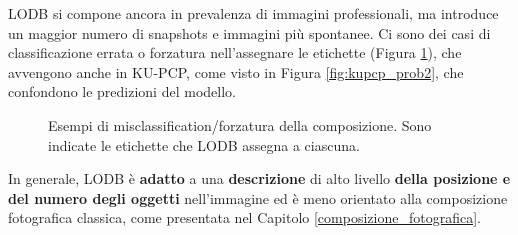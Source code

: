 LODB si compone ancora in prevalenza di immagini professionali, ma introduce un maggior numero di snapshots e immagini più spontanee. Ci sono dei casi di classificazione errata o forzatura nell'assegnare le etichette (Figura \ref{fig:misclassification_lodb}), che avvengono anche in KU-PCP, come visto in Figura \ref{fig:kupcp_prob2}, che confondono le predizioni del modello.
\begin{figure}[t]
    \centering 
    \begin{subfigure}{0.3\textwidth}
    \end{subfigure}
    \hspace{2mm}
    \begin{subfigure}{0.3\textwidth}
    \end{subfigure}
    \hspace{2mm}
    \begin{subfigure}{0.3\textwidth}
    \end{subfigure}
    \caption{Esempi di misclassification/forzatura della composizione. Sono indicate le etichette che LODB assegna a ciascuna.}
    \label{fig:misclassification_lodb}
\end{figure}
In generale, LODB è \textbf{adatto} a una \textbf{descrizione} di alto livello \textbf{della posizione e del numero degli oggetti} nell'immagine ed è meno orientato alla composizione fotografica classica, come presentata nel Capitolo \ref{composizione_fotografica}.


